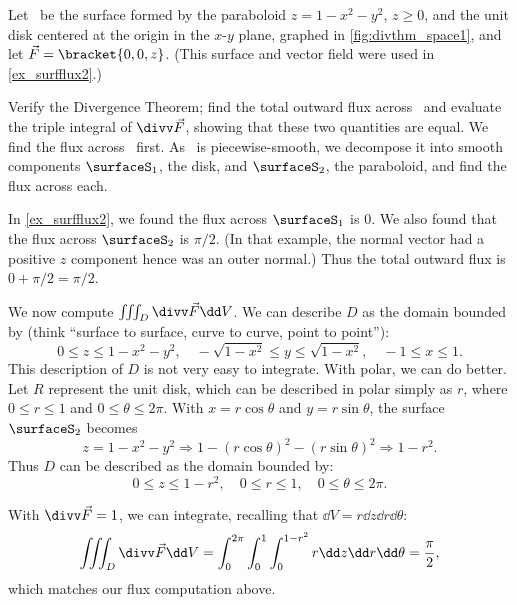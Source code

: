 \begin{example}\label{ex_divthm_space1}
Let \surfaceS\ be the surface formed by the paraboloid $z=1-x^2-y^2$, $z\geq 0$, and the unit disk centered at the origin in the $x$-$y$ plane, graphed in \autoref{fig:divthm_space1}, and let $\vec F =\bracket{0,0,z}$. (This surface and vector field were used in \autoref{ex_surfflux2}.)

Verify the Divergence Theorem; find the total outward flux across \surfaceS\ and evaluate the triple integral of $\divv \vec F$, showing that these two quantities are equal.
\solution
We find the flux across \surfaceS\ first. As \surfaceS\ is piecewise-smooth, we decompose it into smooth components $\surfaceS_1$, the disk, and $\surfaceS_2$, the paraboloid, and find the flux across each.

In \autoref{ex_surfflux2}, we found the flux across $\surfaceS_1$ is 0. We also found that the flux across $\surfaceS_2$ is $\pi/2$. (In that example, the normal vector had a positive $z$ component hence was an outer normal.) Thus the total outward flux is $0+\pi/2 = \pi/2$.

We now compute $\iiint_D \divv \vec F\dd V$. We can describe $D$ as the domain bounded by (think ``surface to surface, curve to curve, point to point''):
\[
0\leq z\leq 1-x^2-y^2,
\quad -\sqrt{1-x^2}\leq y\leq \sqrt{1-x^2},
\quad -1\leq x\leq 1.
\]
This description of $D$ is not very easy to integrate. With polar, we can do better. Let $R$ represent the unit disk, which can be described in polar simply as $r$, where $0\leq r\leq 1$ and $0\leq \theta\leq 2\pi$. With $x=r\cos \theta$ and $y=r\sin\theta$, the surface $\surfaceS_2$ becomes
\[z=1-x^2-y^2 \Rightarrow 1-(r\cos\theta)^2-(r\sin\theta)^2 \Rightarrow 1-r^2.\]
Thus $D$ can be described as the domain bounded by:
\[0\leq z\leq 1-r^2,\quad 0\leq r\leq 1,\quad 0\leq \theta\leq 2\pi.\]

With $\divv \vec F = 1$, we can integrate, recalling that $\dd V = r\dd z\dd r\dd\theta$:
\[
\iiint_D\divv \vec F\dd V
= \int_0^{2\pi}\int_0^1\int_0^{1-r^2} r\dd z\dd r\dd\theta = \frac{\pi}2,
\]
which matches our flux computation above.
\end{example}

